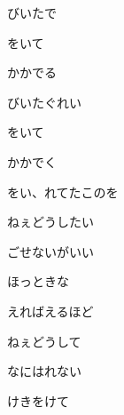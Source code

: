\documentclass[a4paper,tate,twocolumn,12pt]{ltjtarticle}
\begin{document}
\begin{flushleft}
\vspace{2em}

\noindent\begin{minipage}{\linewidth}
びいたで

をいて

かかでる

びいたぐれい

をいて

かかでく
\end{minipage}

\vspace{2em}

\noindent\begin{minipage}{\linewidth}
をい、れてたこのを

ねぇどうしたい

ごせないがいい

ほっときな

えればえるほど

ねぇどうして

なにはれない

けきをけて
\end{minipage}

\end{flushleft}
\end{document}
